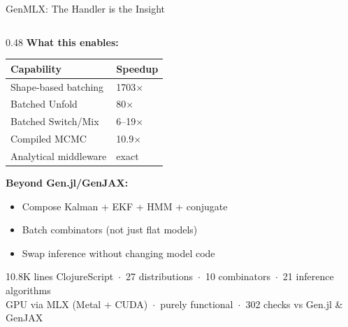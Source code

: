 \documentclass[aspectratio=1610]{beamer}
\begin{document}
\begin{frame}[t]{GenMLX: The Handler is the Insight}
\begin{columns}[T]
\begin{column}{0.48\textwidth}
\textbf{What this enables:}

\smallskip
\small
\begin{tabular}{@{}ll@{}}
\toprule
\textbf{Capability} & \textbf{Speedup} \\
\midrule
Shape-based batching & 1703$\times$ \\
Batched Unfold & 80$\times$ \\
Batched Switch/Mix & 6--19$\times$ \\
Compiled MCMC & 10.9$\times$ \\
Analytical middleware & exact \\
\bottomrule
\end{tabular}

\smallskip

\small\textbf{Beyond Gen.jl/GenJAX:}
\begin{itemize}\itemsep0pt \parskip0pt
    \item Compose Kalman + EKF + HMM + conjugate
    \item Batch combinators (not just flat models)
    \item Swap inference without changing model code
\end{itemize}

\vfill

\scriptsize\color{gray}
10.8K lines ClojureScript \,$\cdot$\, 27 distributions \,$\cdot$\, 10 combinators \,$\cdot$\, 21 inference algorithms\\
GPU via MLX (Metal + CUDA) \,$\cdot$\, purely functional \,$\cdot$\, 302 checks vs Gen.jl \& GenJAX

\end{column}
\end{columns}

\end{frame}
\end{document}
